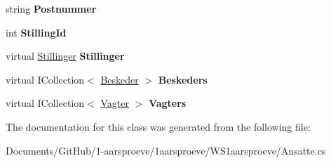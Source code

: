 \begin{DoxyCompactItemize}
\item 
\hypertarget{class_w_s1aarsproeve_1_1_ansatte_a205fd244d9e5f8dad555c4719e850eeb}{}string {\bfseries Postnummer}\label{class_w_s1aarsproeve_1_1_ansatte_a205fd244d9e5f8dad555c4719e850eeb}

\item 
\hypertarget{class_w_s1aarsproeve_1_1_ansatte_a14cb42b82f9aed30d90560db003c36d9}{}int {\bfseries Stilling\+Id}\label{class_w_s1aarsproeve_1_1_ansatte_a14cb42b82f9aed30d90560db003c36d9}

\item 
\hypertarget{class_w_s1aarsproeve_1_1_ansatte_a9aab54458a75700f9f2d8a1153f21d6e}{}virtual \hyperlink{class_w_s1aarsproeve_1_1_stillinger}{Stillinger} {\bfseries Stillinger}\label{class_w_s1aarsproeve_1_1_ansatte_a9aab54458a75700f9f2d8a1153f21d6e}

\item 
\hypertarget{class_w_s1aarsproeve_1_1_ansatte_a8bfae47fc31de8cdb80d5a9e2ee13e39}{}virtual I\+Collection$<$ \hyperlink{class_w_s1aarsproeve_1_1_beskeder}{Beskeder} $>$ {\bfseries Beskeders}\label{class_w_s1aarsproeve_1_1_ansatte_a8bfae47fc31de8cdb80d5a9e2ee13e39}

\item 
\hypertarget{class_w_s1aarsproeve_1_1_ansatte_aac27c59f47c1fe2e694c33691bce0d39}{}virtual I\+Collection$<$ \hyperlink{class_w_s1aarsproeve_1_1_vagter}{Vagter} $>$ {\bfseries Vagters}\label{class_w_s1aarsproeve_1_1_ansatte_aac27c59f47c1fe2e694c33691bce0d39}

\end{DoxyCompactItemize}


The documentation for this class was generated from the following file\+:\begin{DoxyCompactItemize}
\item 
Documents/\+Git\+Hub/1-\/aarsproeve/1aarsproeve/\+W\+S1aarsproeve/Ansatte.\+cs\end{DoxyCompactItemize}
